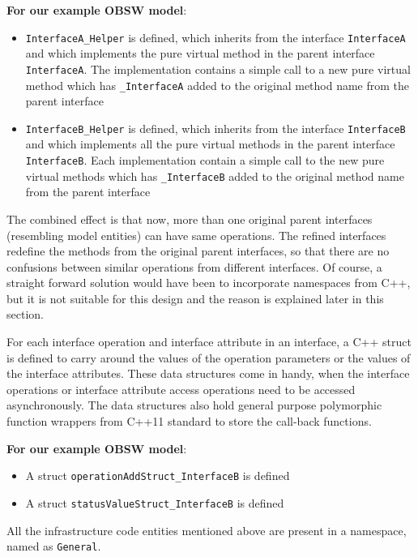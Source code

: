 \textbf{For our example OBSW model}:
\begin{itemize}
\item \texttt{InterfaceA\allowbreak\_Helper} is defined, which inherits from the interface \texttt{InterfaceA} and which implements the pure virtual method in the parent interface \texttt{InterfaceA}. The implementation contains a simple call to a new pure virtual method which has \texttt{\_InterfaceA} added to the original method name from the parent interface

\item \texttt{InterfaceB\allowbreak\_Helper} is defined, which inherits from the interface \texttt{InterfaceB} and which implements all the pure virtual methods in the parent interface \texttt{InterfaceB}. Each implementation contain a simple call to the new pure virtual methods which has \texttt{\_InterfaceB} added to the original method name from the parent interface    
\end{itemize}

The combined effect is that now, more than one original parent interfaces (resembling model entities) can have same operations. The refined interfaces redefine the methods from the original parent interfaces, so that there are no confusions between similar operations from different interfaces. Of course, a straight forward solution would have been to incorporate namespaces from C++, but it is not suitable for this design and the reason is explained later in this section. 

For each interface operation and interface attribute in an interface, a C++ struct is defined to carry around the values of the operation parameters or the values of the interface attributes. These data structures come in handy, when the interface operations or interface attribute access operations need to be accessed asynchronously. The data structures also hold general purpose polymorphic function wrappers from C++11 standard to store the call-back functions. 

\textbf{For our example OBSW model}:
\begin{itemize}
\item A struct \texttt{operationAdd\allowbreak Struct\_\allowbreak InterfaceB} is defined
\item A struct \texttt{statusValue\allowbreak Struct\_\allowbreak InterfaceB} is defined
\end{itemize}  

All the infrastructure code entities mentioned above are present in a namespace, named as \texttt{General}.

